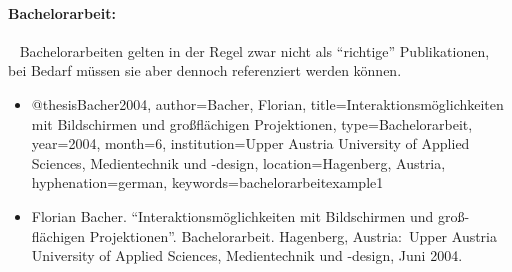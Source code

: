 
\paragraph{Bachelorarbeit:} ~ \newline
Bachelorarbeiten gelten in der Regel zwar nicht als "`richtige"' Publikationen, bei Bedarf müssen sie aber dennoch referenziert werden können. 
%
\begin{itemize}
\item[]
\begin{GenericCode}[numbers=none]
@thesis{Bacher2004,
	author={Bacher, Florian},
	title={Interaktionsmöglichkeiten mit Bildschirmen und großflächigen Projektionen},
	type={Bachelorarbeit},
	year={2004},
	month={6},
	institution={Upper Austria University of Applied Sciences, Medientechnik und {-design}},
	location={Hagenberg, Austria},
	hyphenation={german},
	keywords={bachelorarbeitexample1} 
}
\end{GenericCode}
\item[\cite{Bacher2004}]
Florian Bacher. "`Interaktionsmöglichkeiten mit Bildschirmen und groß-
flächigen Projektionen"'. Bachelorarbeit. Hagenberg, Austria:\ Upper
Austria University of Applied Sciences, Medientechnik und {-design},
Juni 2004.
\end{itemize}
%



